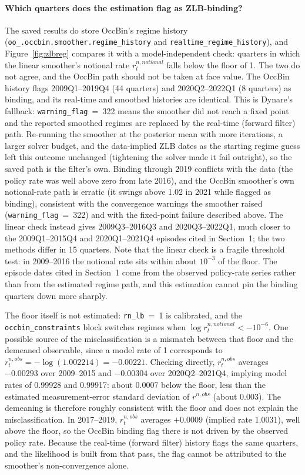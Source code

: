 \documentclass[11pt]{article}
\begin{document}
\paragraph{Which quarters does the estimation flag as ZLB-binding?}
The saved results do store OccBin's regime history (\texttt{oo\_.occbin.smoother.regime\_history}
and \texttt{realtime\_regime\_history}), and Figure~\ref{fig:zlbreg} compares
it with a model-independent check: quarters in which the linear
smoother's notional rate $r^{n,notional}_t$ falls below the floor of 1.
The two do not agree, and the OccBin path should not be taken at face
value. The OccBin history flags 2009Q1--2019Q4 (44 quarters) and
2020Q2--2022Q1 (8 quarters) as binding, and its real-time and smoothed
histories are identical. This is Dynare's fallback: \texttt{warning\_flag}~=~322
means the smoother did not reach a fixed point and the reported
smoothed regimes are replaced by the real-time (forward filter) path.
Re-running the smoother at the posterior mean with more iterations, a
larger solver budget, and the data-implied ZLB dates as the starting
regime guess left this outcome unchanged (tightening the solver made it
fail outright), so the saved path is the filter's own. Binding through 2019 conflicts with the data
(the policy rate was well above zero from late 2016), and the OccBin
smoother's own notional-rate path is erratic (it swings above 1.02 in
2021 while flagged as binding), consistent with the convergence warnings
the smoother raised (\texttt{warning\_flag}~=~322) and with the
fixed-point failure described above. The linear check instead gives
2009Q3--2016Q3 and 2020Q3--2022Q1, much closer to the
2009Q1--2015Q4 and 2020Q1--2021Q4 episodes cited in Section~1; the two
methods differ in 15 quarters. Note that the linear check is a fragile
threshold test: in 2009--2016 the notional rate sits within about
$10^{-3}$ of the floor. The episode dates cited in Section~1 come from the
observed policy-rate series rather than from the estimated regime path,
and this estimation cannot pin the binding quarters down more sharply.

The floor itself is not estimated: \texttt{rn\_lb}~=~1 is calibrated, and the
\texttt{occbin\_constraints} block switches regimes when
$\log r^{n,notional}_t<-10^{-6}$. One possible source of the
misclassification is a mismatch between that floor and the demeaned
observable, since a model rate of 1 corresponds to
$r^{n,obs}_t=-\log(1.002214)=-0.00221$. Checking directly, $r^{n,obs}_t$
averages $-0.00293$ over 2009--2015 and $-0.00304$ over 2020Q2--2021Q4,
implying model rates of 0.99928 and 0.99917: about 0.0007 below the floor,
less than the estimated measurement-error standard deviation of
$r^{n,obs}$ (about 0.003). The demeaning is therefore roughly consistent
with the floor and does not explain the misclassification. In 2017--2019,
$r^{n,obs}_t$ averages $+0.0009$ (implied rate 1.0031), well above the
floor, so the OccBin binding flag there is not driven by the observed
policy rate. Because the real-time (forward filter) history flags the
same quarters, and the likelihood is built from that pass, the flag
cannot be attributed to the smoother's non-convergence alone.
\end{document}
